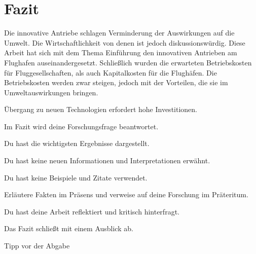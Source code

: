 \chapter{Fazit}
\label{ch:Fazit}
Die innovative Antriebe schlagen Verminderung der Auswirkungen auf die Umwelt. Die Wirtschaftlichkeit von denen ist jedoch diskussionswürdig.
Diese Arbeit hat sich mit dem Thema Einführung den innovativen Antrieben am Flughafen auseinandergesetzt. Schließlich wurden die
erwarteten Betriebskosten für Fluggesellschaften, als auch Kapitalkosten für die Flughäfen. Die Betriebskosten werden zwar steigen,
jedoch mit der Vorteilen, die sie im Umweltauswirkungen bringen.


Übergang zu neuen Technologien erfordert hohe Investitionen.

Im Fazit wird deine Forschungsfrage beantwortet.

Du hast die wichtigsten Ergebnisse dargestellt.

Du hast keine neuen Informationen und Interpretationen erwähnt.

Du hast keine Beispiele und Zitate verwendet.

Erläutere Fakten im Präsens und verweise auf deine Forschung im Präteritum.

Du hast deine Arbeit reflektiert und kritisch hinterfragt.

Das Fazit schließt mit einem Ausblick ab.

Tipp vor der Abgabe